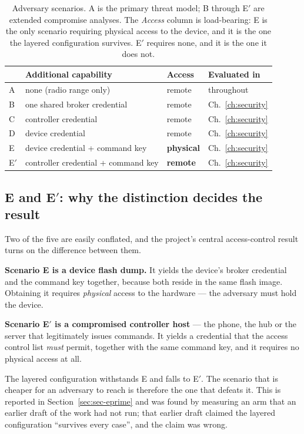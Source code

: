 \begin{table}[htbp]
\centering
\caption[Adversary scenarios]{Adversary scenarios. A is the primary threat model; B through
E$'$ are extended compromise analyses. The \emph{Access} column is load-bearing: E is the only
scenario requiring physical access to the device, and it is the one the layered configuration
survives. E$'$ requires none, and it is the one it does not.}
\label{tab:rep-threats}
\begin{tabular}{@{}llll@{}}
\toprule
& Additional capability & Access & Evaluated in \\
\midrule
A    & none (radio range only)             & remote            & throughout \\
B    & one shared broker credential        & remote            & Ch.~\ref{ch:security} \\
C    & controller credential               & remote            & Ch.~\ref{ch:security} \\
D    & device credential                   & remote            & Ch.~\ref{ch:security} \\
E    & device credential + command key     & \textbf{physical} & Ch.~\ref{ch:security} \\
E$'$ & controller credential + command key & \textbf{remote}   & Ch.~\ref{ch:security} \\
\bottomrule
\end{tabular}
\end{table}

\subsection{E and E$'$: why the distinction decides the result}

Two of the five are easily conflated, and the project's central access-control result turns on
the difference between them.

\textbf{Scenario E is a device flash dump.} It yields the device's broker credential and the
command key together, because both reside in the same flash image. Obtaining it requires
\emph{physical} access to the hardware — the adversary must hold the device.

\textbf{Scenario E$'$ is a compromised controller host} — the phone, the hub or the server that
legitimately issues commands. It yields a credential that the access control list \emph{must}
permit, together with the same command key, and it requires no physical access at all.

The layered configuration withstands E and falls to E$'$. The scenario that is cheaper for an
adversary to reach is therefore the one that defeats it. This is reported in
Section~\ref{sec:sec-eprime} and was found by measuring an arm that an earlier draft of the
work had not run; that earlier draft claimed the layered configuration ``survives every case'',
and the claim was wrong.

